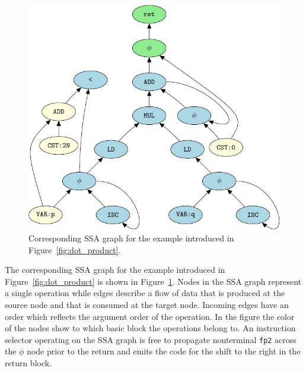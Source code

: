 \begin{figure}
\begin{center}

    \includegraphics{fig/pgf-fig004}
  \end{center}
  \caption{Corresponding SSA graph for the example introduced in
    Figure~\ref{fig:dot_product}.}\label{fig:ssa_graph}
\end{figure}

The corresponding SSA graph for the example introduced in
Figure~\ref{fig:dot_product} is shown in Figure~\ref{fig:ssa_graph}.
Nodes in the SSA graph represent a single operation while edges
describe a flow of data that is produced at the source node and that
is consumed at the target node. Incoming edges have an order which reflects the argument
order of the operation. In the figure the color of the nodes
show to which basic block the operations belong to. An instruction
selector operating on the SSA graph is free to propagate nonterminal \texttt{fp2}
across the $\phi$ node prior to the return and emits the
code for the shift to the right in the return block.

